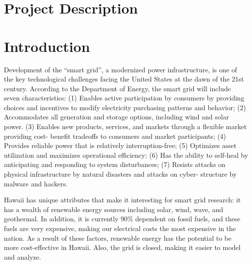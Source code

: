 
\renewcommand{\thepage} {C--\arabic{page}}

\renewcommand{\thesection} {C.\arabic{section}}
\setcounter{section}{0}

\section{Project Description}

\section{Introduction}

Development of the ``smart grid'', a modernized power infrastructure, is
one of the key technological challenges facing the United States at the
dawn of the 21st century. According to the Department of Energy, the smart
grid will include seven characteristics: (1) Enables active participation
by consumers by providing choices and incentives to modify electricity
purchasing patterns and behavior; (2) Accommodates all generation and
storage options, including wind and solar power.  (3) Enables new products,
services, and markets through a flexible market providing cost- benefit
tradeoffs to consumers and market participants; (4) Provides reliable power
that is relatively interruption-free; (5) Optimizes asset utilization and
maximizes operational efficiency; (6)  Has the ability to self-heal by 
anticipating and responding to system disturbances; (7) Resists attacks on
physical infrastructure by natural disasters and attacks on cyber-
structure by malware and hackers.


Hawaii has unique attributes that make it interesting for smart grid
research: it has a wealth of renewable energy sources including solar,
wind, wave, and geothermal.  In addition, it is currently 90\% dependent on
fossil fuels, and these fuels are very expensive, making our electrical
costs the most expensive in the nation.  As a result of these factors,
renewable energy has the potential to be more cost-effective in Hawaii.
Also, the grid is closed, making it easier to model and analyze.


